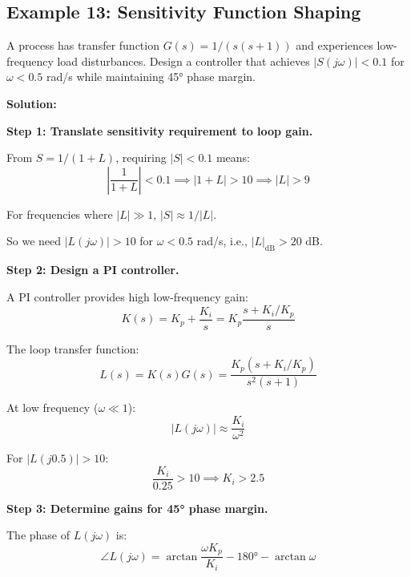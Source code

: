 \subsection{Example 13: Sensitivity Function Shaping}

\begin{example}
\label{ex:sensitivity_shaping}
A process has transfer function $G(s) = 1/(s(s+1))$ and experiences low-frequency load disturbances. Design a controller that achieves $|S(j\omega)| < 0.1$ for $\omega < 0.5$ rad/s while maintaining 45° phase margin.

\textbf{Solution:}

\textbf{Step 1: Translate sensitivity requirement to loop gain.}

From $S = 1/(1+L)$, requiring $|S| < 0.1$ means:
\begin{equation}
\left|\frac{1}{1+L}\right| < 0.1 \implies |1 + L| > 10 \implies |L| > 9
\end{equation}

For frequencies where $|L| \gg 1$, $|S| \approx 1/|L|$.

So we need $|L(j\omega)| > 10$ for $\omega < 0.5$ rad/s, i.e., $|L|_{\text{dB}} > 20$ dB.

\textbf{Step 2: Design a PI controller.}

A PI controller provides high low-frequency gain:
\begin{equation}
K(s) = K_p + \frac{K_i}{s} = K_p\frac{s + K_i/K_p}{s}
\end{equation}

The loop transfer function:
\begin{equation}
L(s) = K(s)G(s) = \frac{K_p(s + K_i/K_p)}{s^2(s+1)}
\end{equation}

At low frequency ($\omega \ll 1$):
\begin{equation}
|L(j\omega)| \approx \frac{K_i}{\omega^2}
\end{equation}

For $|L(j0.5)| > 10$:
\begin{equation}
\frac{K_i}{0.25} > 10 \implies K_i > 2.5
\end{equation}

\textbf{Step 3: Determine gains for 45° phase margin.}

The phase of $L(j\omega)$ is:
\begin{equation}
\angle L(j\omega) = \arctan\frac{\omega K_p}{K_i} - 180° - \arctan\omega
\end{equation}


\end{example}
